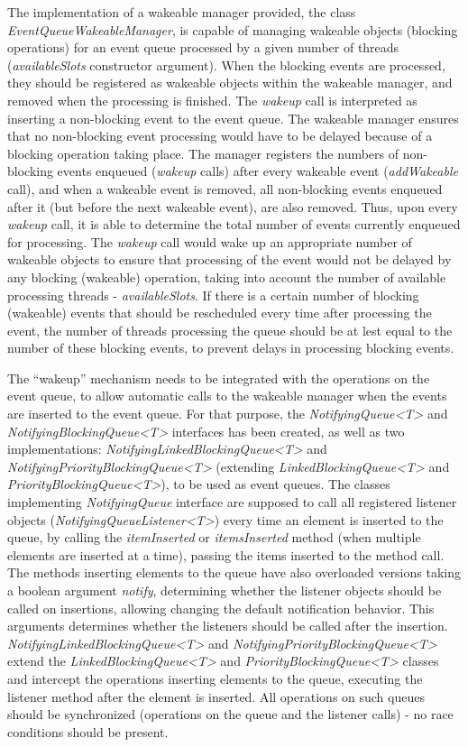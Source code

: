 The implementation of a wakeable manager provided, the class \emph{EventQueueWakeableManager}, is capable of managing wakeable objects (blocking operations) for an event queue processed by a given number of threads (\emph{availableSlots} constructor argument). When the blocking events are processed, they should be registered as wakeable objects within the wakeable manager, and removed when the processing is finished. The \emph{wakeup} call is interpreted as inserting a non-blocking event to the event queue. The wakeable manager ensures that no non-blocking event processing would have to be delayed because of a blocking operation taking place. The manager registers the numbers of non-blocking events enqueued (\emph{wakeup} calls) after every wakeable event (\emph{addWakeable} call), and when a wakeable event is removed, all non-blocking events enqueued after it (but before the next wakeable event), are also removed. Thus, upon every \emph{wakeup} call, it is able to determine the total number of events currently enqueued for processing. The \emph{wakeup} call would wake up an appropriate number of wakeable objects to ensure that processing of the event would not be delayed by any blocking (wakeable) operation, taking into account the number of available processing threads - \emph{availableSlots}. If there is a certain number of blocking (wakeable) events that should be rescheduled every time after processing the event, the number of threads processing the queue should be at lest equal to the number of these blocking events, to prevent delays in processing blocking events.

The ``wakeup'' mechanism needs to be integrated with the operations on the event queue, to allow automatic calls to the wakeable manager when the events are inserted to the event queue. For that purpose, the \emph{NotifyingQueue<T>} and \emph{NotifyingBlockingQueue<T>} interfaces has been created, as well as two implementations: \emph{NotifyingLinkedBlockingQueue<T>} and \emph{NotifyingPriorityBlockingQueue<T>} (extending \emph{LinkedBlockingQueue<T>} and \emph{PriorityBlockingQueue<T>}), to be used as event queues. The classes implementing \emph{NotifyingQueue} interface are supposed to call all registered listener objects (\emph{NotifyingQueueListener<T>}) every time an element is inserted to the queue, by calling the \emph{itemInserted} or \emph{itemsInserted} method (when multiple elements are inserted at a time), passing the items inserted to the method call. The methods inserting elements to the queue have also overloaded versions taking a boolean argument \emph{notify}, determining whether the listener objects should be called on insertions, allowing changing the default notification behavior. This arguments determines whether the listeners should be called after the insertion. \emph{NotifyingLinkedBlockingQueue<T>} and \emph{NotifyingPriorityBlockingQueue<T>} extend the \emph{LinkedBlockingQueue<T>} and \emph{PriorityBlockingQueue<T>} classes and intercept the operations inserting elements to the queue, executing the listener method after the element is inserted. All operations on such queues should be synchronized (operations on the queue and the listener calls) - no race conditions should be present. 

